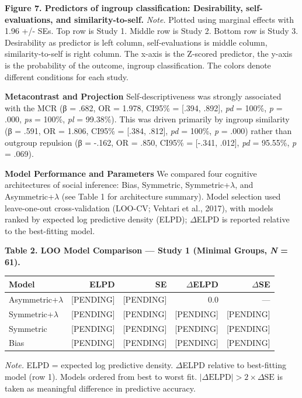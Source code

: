 \documentclass[
  man,
  longtable,
  nolmodern,
  notxfonts,
  notimes,
  man]{apa7}
\begin{document}
\textbf{Figure 7. Predictors of ingroup classification: Desirability,
self-evaluations, and similarity-to-self.} \emph{Note.} Plotted using
marginal effects with 1.96 +/- SEs. Top row is Study 1. Middle row is
Study 2. Bottom row is Study 3. Desirability as predictor is left
column, self-evaluations is middle column, similarity-to-self is right
column. The x-axis is the Z-scored predictor, the y-axis is the
probability of the outcome, ingroup classification. The colors denote
different conditions for each study.

\textbf{Metacontrast and Projection} Self-descriptiveness was strongly
associated with the MCR (β = .682, OR = 1.978, CI95\% = {[}.394,
.892{]}, \emph{pd} = 100\%, \emph{p} = .000, \emph{ps} = 100\%,
\emph{pl} = 99.38\%). This was driven primarily by ingroup similarity (β
= .591, OR = 1.806, CI95\% = {[}.384, .812{]}, \emph{pd} = 100\%,
\emph{p} = .000) rather than outgroup repulsion (β = -.162, OR = .850,
CI95\% = {[}-.341, .012{]}, \emph{pd} = 95.55\%, \emph{p} = .069).

\textbf{Model Performance and Parameters} We compared four cognitive
architectures of social inference: Bias, Symmetric,
Symmetric+\(\lambda\), and Asymmetric+\(\lambda\) (see Table 1 for
architecture summary). Model selection used leave-one-out
cross-validation (LOO-CV; Vehtari et al., 2017), with models ranked by
expected log predictive density (ELPD); \(\Delta\)ELPD is reported
relative to the best-fitting model.

\textbf{Table 2. LOO Model Comparison --- Study 1 (Minimal Groups,
\emph{N} = 61).}

\begin{longtable}[]{@{}lrrrr@{}}
\toprule\noalign{}
Model & ELPD & SE & \(\Delta\)ELPD & \(\Delta\)SE \\
\midrule\noalign{}
\endhead
\bottomrule\noalign{}
\endlastfoot
Asymmetric+\(\lambda\) & {[}PENDING{]} & {[}PENDING{]} & 0.0 & --- \\
Symmetric+\(\lambda\) & {[}PENDING{]} & {[}PENDING{]} & {[}PENDING{]} &
{[}PENDING{]} \\
Symmetric & {[}PENDING{]} & {[}PENDING{]} & {[}PENDING{]} &
{[}PENDING{]} \\
Bias & {[}PENDING{]} & {[}PENDING{]} & {[}PENDING{]} & {[}PENDING{]} \\
\end{longtable}

\emph{Note.} ELPD = expected log predictive density. \(\Delta\)ELPD
relative to best-fitting model (row 1). Models ordered from best to
worst fit. \(|\Delta\text{ELPD}| > 2 \times \Delta\text{SE}\) is taken
as meaningful difference in predictive accuracy.
\end{document}
